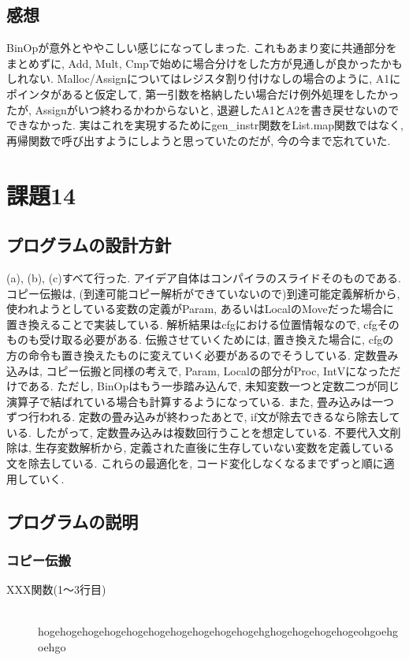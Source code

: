 \documentclass{jarticle}
\begin{document}
\subsection{感想}
BinOpが意外とややこしい感じになってしまった. これもあまり変に共通部分をまとめずに, Add, Mult, Cmpで始めに場合分けをした方が見通しが良かったかもしれない. Malloc/Assignについてはレジスタ割り付けなしの場合のように, A1にポインタがあると仮定して, 第一引数を格納したい場合だけ例外処理をしたかったが, Assignがいつ終わるかわからないと, 退避したA1とA2を書き戻せないのでできなかった. 実はこれを実現するためにgen\_instr関数をList.map関数ではなく, 再帰関数で呼び出すようにしようと思っていたのだが, 今の今まで忘れていた.


\section{課題14}
\subsection{プログラムの設計方針}
(a), (b), (c)すべて行った. アイデア自体はコンパイラのスライドそのものである. コピー伝搬は, (到達可能コピー解析ができていないので)到達可能定義解析から, 使われようとしている変数の定義がParam, あるいはLocalのMoveだった場合に置き換えることで実装している. 解析結果はcfgにおける位置情報なので, cfgそのものも受け取る必要がある. 伝搬させていくためには, 置き換えた場合に, cfgの方の命令も置き換えたものに変えていく必要があるのでそうしている. 定数畳み込みは, コピー伝搬と同様の考えで, Param, Localの部分がProc, IntVになっただけである. ただし, BinOpはもう一歩踏み込んで, 未知変数一つと定数二つが同じ演算子で結ばれている場合も計算するようになっている. また, 畳み込みは一つずつ行われる. 定数の畳み込みが終わったあとで, if文が除去できるなら除去している. したがって, 定数畳み込みは複数回行うことを想定している. 不要代入文削除は, 生存変数解析から, 定義された直後に生存していない変数を定義している文を除去している. これらの最適化を, コード変化しなくなるまでずっと順に適用していく. 
\subsection{プログラムの説明}
\subsubsection{コピー伝搬}
\begin{description}
\item[XXX関数(1〜3行目)] \leavevmode \\
hogehogehogehogehogehogehogehogehogehogehghogehogehogehogeohgoehgoehgo
\end{description}
\end{document}
